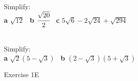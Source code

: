 \documentclass[fleqn]{article}
\begin{document}
\begin{examplebox}{}{}
    \\ %
    Simplify: \\
    \textbf{a}\hspace{2mm} $\sqrt{12}$                           \hspace{15mm} \
    \textbf{b}\hspace{2mm} $\cfrac{\sqrt{20}}{2}$                \hspace{15mm} \
    \textbf{c}\hspace{2mm} $5\sqrt{6}-2\sqrt{24}+\sqrt{294}$     \hspace{15mm}
\end{examplebox}

\vspace{5cm}
\begin{examplebox}{}{}
    \\ %
    Simplify: \\
    \textbf{a}\hspace{2mm} $\sqrt{2}(5-\sqrt{3})$        \hspace{20mm} \
    \textbf{b}\hspace{2mm} $(2-\sqrt{3})(5+\sqrt{3})$    \hspace{20mm}
\end{examplebox}

\vfill
\begin{practice*}{Exercise 1E}{}
\end{practice*}
\newpage
\end{document}
